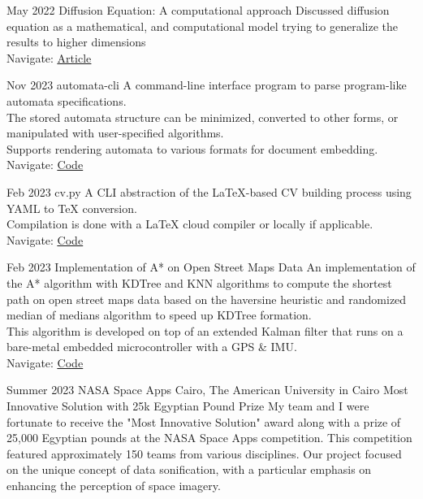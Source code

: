 \documentclass[hidelinks]{report}
\begin{document}
\entry
    {May 2022}
    {Diffusion Equation: A computational approach}  
    {} 
    {
        \textbullet Discussed diffusion equation as a mathematical, and computational
        model trying to generalize the results to higher dimensions \\
        \textbullet Navigate: \href{\blog/diffusion}{\underline{Article}}
    }

\vspace{2mm}



\entry
    {Nov 2023}
    {automata-cli}
    {}
    {
    \textbullet A command-line interface program to parse program-like automata specifications. \\ 
    \textbullet The stored automata structure can be minimized, converted to other forms, or 
    manipulated with user-specified algorithms. \\ 
    \textbullet Supports rendering automata to various formats for document embedding.\\
    \textbullet Navigate: \href{\github/automata-cli}{\underline{Code}}
    }

\entry
    {Feb 2023}
    {cv.py}
    {}     
    {
      \textbullet A CLI abstraction of the LaTeX-based CV building process using YAML to TeX conversion.\\
      \textbullet Compilation is done with a LaTeX cloud compiler or locally if applicable.
      \textbullet Navigate: \href{\github/CV.py}{\underline{Code}}
    }

\entry
    {Feb 2023}
    {Implementation of A* on Open Street Maps Data }
    {}     
    {
       \textbullet An implementation of the A* algorithm with KDTree and KNN algorithms to compute the shortest path on open street maps data based on the haversine heuristic and randomized median of medians algorithm to speed up KDTree formation.\\
       \textbullet This algorithm is developed on top of an extended Kalman filter that runs on a bare-metal embedded microcontroller with a GPS \& IMU. \\
       \textbullet Navigate: \href{\github/Astar-OSM}{\underline{Code}}
    }


\vspace{2mm}


\entry
    {Summer 2023}
    {NASA Space Apps Cairo, \normalfont The American University in Cairo }  
    {Most Innovative Solution with 25k Egyptian Pound Prize}
    {
      My team and I were fortunate to receive the "Most Innovative Solution" award along with a prize of 25,000 Egyptian pounds at the NASA Space Apps competition. This competition featured approximately 150 teams from various disciplines. Our project focused on the unique concept of data sonification, with a particular emphasis on enhancing the perception of space imagery.  
    }
    
\end{document}
